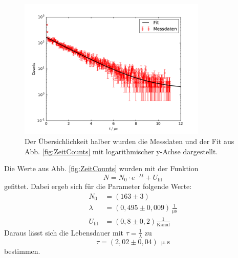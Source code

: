 \begin{figure}
  \centering
  \includegraphics[width=0.8\textwidth]{plots/ZeitCountslinear.pdf}
  \caption{Der Übersichlichkeit halber wurden die Messdaten und der Fit aus Abb. \ref{fig:ZeitCounts} mit logarithmischer y-Achse dargestellt.}
  \label{fig:ZeitCountslin}
\end{figure}
Die Werte aus Abb. \ref{fig:ZeitCounts} wurden mit der Funktion
\begin{equation}
  N=N_0\cdot e^{-\lambda t}+U_{\text{fit}}
\end{equation}
gefittet.
Dabei ergeb sich für die Parameter folgende Werte:
\begin{align*}
  N_0&=(163 \pm 3)\\
  \lambda&=(0,495 \pm 0,009)\,\frac{1}{\upmu\text{s}}\\
  U_{\text{fit}}&=(0,8 \pm 0,2) \frac{1}{\text{Kanal}}
\end{align*}
Daraus lässt sich die Lebensdauer mit $\tau=\frac{1}{\lambda}$ zu
\begin{equation*}
  \tau=(2,02\pm0,04)\,\upmu\text{s}
\end{equation*}
bestimmen.
